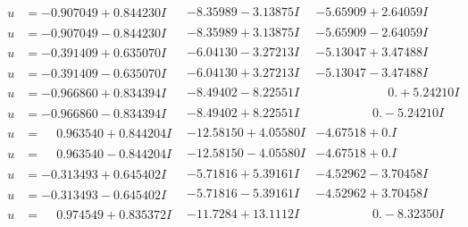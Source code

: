 \documentclass[1p]{elsarticle_modified}
\theoremstyle{definition}
\begin{document}
$$\begin{array}{c|c|c}
 \hline 
\begin{aligned}
u &= -0.907049 + 0.844230 I\end{aligned}
 & -8.35989 - 3.13875 I & -5.65909 + 2.64059 I \\ \hline\begin{aligned}
u &= -0.907049 - 0.844230 I\end{aligned}
 & -8.35989 + 3.13875 I & -5.65909 - 2.64059 I \\ \hline\begin{aligned}
u &= -0.391409 + 0.635070 I\end{aligned}
 & -6.04130 - 3.27213 I & -5.13047 + 3.47488 I \\ \hline\begin{aligned}
u &= -0.391409 - 0.635070 I\end{aligned}
 & -6.04130 + 3.27213 I & -5.13047 - 3.47488 I \\ \hline\begin{aligned}
u &= -0.966860 + 0.834394 I\end{aligned}
 & -8.49402 - 8.22551 I & \phantom{-0.000000 -}0. + 5.24210 I \\ \hline\begin{aligned}
u &= -0.966860 - 0.834394 I\end{aligned}
 & -8.49402 + 8.22551 I & \phantom{-0.000000 } 0. - 5.24210 I \\ \hline\begin{aligned}
u &= \phantom{-}0.963540 + 0.844204 I\end{aligned}
 & -12.58150 + 4.05580 I & -4.67518 + 0. I\phantom{ +0.000000I} \\ \hline\begin{aligned}
u &= \phantom{-}0.963540 - 0.844204 I\end{aligned}
 & -12.58150 - 4.05580 I & -4.67518 + 0. I\phantom{ +0.000000I} \\ \hline\begin{aligned}
u &= -0.313493 + 0.645402 I\end{aligned}
 & -5.71816 + 5.39161 I & -4.52962 - 3.70458 I \\ \hline\begin{aligned}
u &= -0.313493 - 0.645402 I\end{aligned}
 & -5.71816 - 5.39161 I & -4.52962 + 3.70458 I \\ \hline\begin{aligned}
u &= \phantom{-}0.974549 + 0.835372 I\end{aligned}
 & -11.7284 + 13.1112 I & \phantom{-0.000000 } 0. - 8.32350 I \\ \hline\begin{aligned}

\end{aligned}
\end{array}$$
\end{document}
